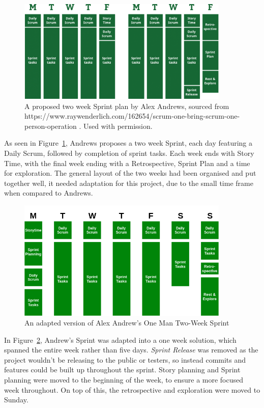 \documentclass[a4paper,10pt]{report}
\begin{document}
\begin{figure}[h!]
    \centering
  \includegraphics[width=0.9\textwidth]{Images/External/RayWenderlich.png}
 \caption [A proposed two week Sprint plan by Alex Andrews]{A proposed two week Sprint plan by Alex Andrews, sourced from https://www.raywenderlich.com/162654/scrum-one-bring-scrum-one-person-operation . Used with permission.}
 \label{fig:two_week_sprint_plan}
\end{figure}

As seen in Figure~\ref{fig:two_week_sprint_plan}, Andrews proposes a two week Sprint, each day featuring a Daily Scrum, followed by completion of sprint tasks. Each week ends with Story Time, with the final week ending with a Retrospective, Sprint Plan and a time for exploration. The general layout of the two weeks had been organised and put together well, it needed adaptation for this project, due to the small time frame when compared to Andrews. \medskip

\begin{figure}[h!]
    \centering
  \includegraphics[width=0.9\textwidth]{Images/Charts/Sprint_Plan.png}
 \caption{An adapted version of Alex Andrew's One Man Two-Week Sprint}
 \label{fig:one_week_sprint_plan}
\end{figure}

In Figure~\ref{fig:one_week_sprint_plan}, Andrew's Sprint was adapted into a one week solution, which spanned the entire week rather than five days. \textit{Sprint Release} was removed as the project wouldn't be releasing to the public or testers, so instead commits and features could be built up throughout the sprint. Story planning and Sprint planning were moved to the beginning of the week, to ensure a more focused week throughout. On top of this, the retrospective and exploration were moved to Sunday. \medskip
\end{document}
